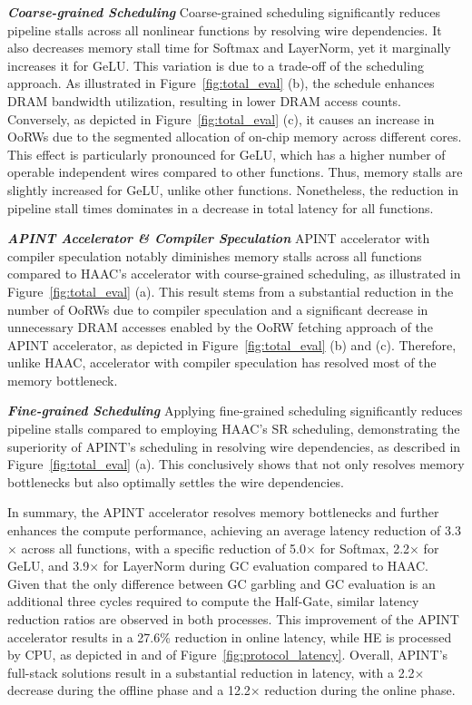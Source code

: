 \textit{\textbf{Coarse-grained Scheduling}} Coarse-grained scheduling significantly reduces pipeline stalls across all nonlinear functions by resolving wire dependencies. It also decreases memory stall time for Softmax and LayerNorm, yet it marginally increases it for GeLU. This variation is due to a trade-off of the scheduling approach. As illustrated in Figure~\ref{fig:total_eval} (b), the schedule enhances DRAM bandwidth utilization, resulting in lower DRAM access counts. Conversely, as depicted in Figure~\ref{fig:total_eval} (c), it causes an increase in OoRWs due to the segmented allocation of on-chip memory across different cores. This effect is particularly pronounced for GeLU, which has a higher number of operable independent wires compared to other functions. Thus, memory stalls are slightly increased for GeLU, unlike other functions. Nonetheless, the reduction in pipeline stall times dominates in a decrease in total latency for all functions.

\textit{\textbf{APINT Accelerator \& Compiler Speculation}} APINT accelerator with compiler speculation notably diminishes memory stalls across all functions compared to HAAC's accelerator with course-grained scheduling, as illustrated in Figure~\ref{fig:total_eval} (a). This result stems from a substantial reduction in the number of OoRWs due to compiler speculation and a significant decrease in unnecessary DRAM accesses enabled by the OoRW fetching approach of the APINT accelerator, as depicted in Figure~\ref{fig:total_eval} (b) and (c). Therefore, unlike HAAC, \sysname accelerator with compiler speculation has resolved most of the memory bottleneck.

\textit{\textbf{Fine-grained Scheduling}} Applying fine-grained scheduling significantly reduces pipeline stalls compared to employing HAAC's SR scheduling, demonstrating the superiority of APINT's scheduling in resolving wire dependencies, as described in Figure~\ref{fig:total_eval} (a). This conclusively shows that \sysname not only resolves memory bottlenecks but also optimally settles the wire dependencies.

In summary, the APINT accelerator resolves memory bottlenecks and further enhances the compute performance, achieving an average latency reduction of 3.3$\times$ across all functions, with a specific reduction of 5.0$\times$ for Softmax, 2.2$\times$ for GeLU, and 3.9$\times$ for LayerNorm during GC evaluation compared to HAAC. Given that the only difference between GC garbling and GC evaluation is an additional three cycles required to compute the Half-Gate, similar latency reduction ratios are observed in both processes. This improvement of the APINT accelerator results in a 27.6\% reduction in online latency, while HE is processed by CPU, as depicted in  and  of Figure~\ref{fig:protocol_latency}. Overall, APINT's full-stack solutions result in a substantial reduction in latency, with a 2.2$\times$ decrease during the offline phase and a 12.2$\times$ reduction during the online phase.

